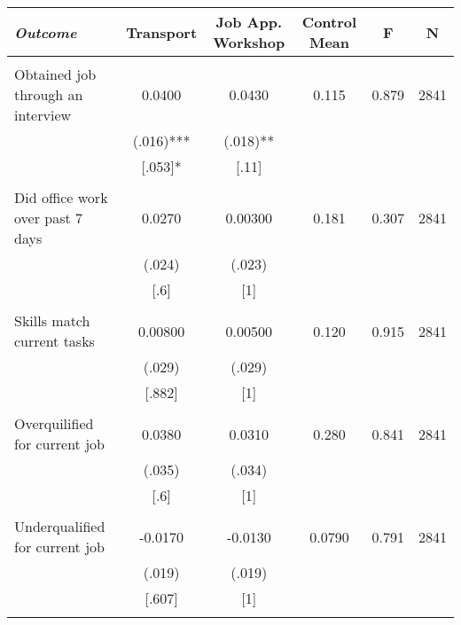 \begin{tabular}{lccccc} \hline
\multicolumn{1}{l}{\emph{Outcome}} & \multicolumn{1}{c}{Transport} &\multicolumn{1}{c}{Job App. Workshop} & \multicolumn{1}{c}{Control Mean} & \multicolumn{1}{c}{F} & \multicolumn{1}{c}{N} \\ \hline \\
Obtained job through an interview & 0.0400 & 0.0430 & 0.115 & 0.879 & 2841 \\
& (.016)*** & (.018)** &  &  &  \\
& [.053]* & [.11] &  &  &  \\
&  &  &  &  &  \\
Did office work over past 7 days & 0.0270 & 0.00300 & 0.181 & 0.307 & 2841 \\
& (.024) & (.023) &  &  &  \\
& [.6] & [1] &  &  &  \\
&  &  &  &  &  \\
Skills match current tasks & 0.00800 & 0.00500 & 0.120 & 0.915 & 2841 \\
& (.029) & (.029) &  &  &  \\
& [.882] & [1] &  &  &  \\
&  &  &  &  &  \\
Overquilified for current job & 0.0380 & 0.0310 & 0.280 & 0.841 & 2841 \\
& (.035) & (.034) &  &  &  \\
& [.6] & [1] &  &  &  \\
&  &  &  &  &  \\
Underqualified for current job & -0.0170 & -0.0130 & 0.0790 & 0.791 & 2841 \\
& (.019) & (.019) &  &  &  \\
& [.607] & [1] &  &  &  \\
&  &  &  &  &  \\ \hline
\end{tabular}
